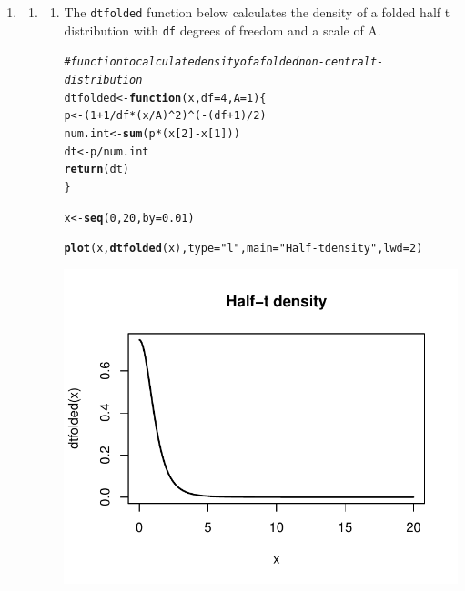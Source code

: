 \documentclass[12pt]{article}\usepackage[]{graphicx}\usepackage[]{color}
\makeatletter
\newcommand{\hlnum}[1]{\textcolor[rgb]{0.686,0.059,0.569}{#1}}%
\newcommand{\hlstr}[1]{\textcolor[rgb]{0.192,0.494,0.8}{#1}}%
\newcommand{\hlcom}[1]{\textcolor[rgb]{0.678,0.584,0.686}{\textit{#1}}}%
\newcommand{\hlopt}[1]{\textcolor[rgb]{0,0,0}{#1}}%
\newcommand{\hlstd}[1]{\textcolor[rgb]{0.345,0.345,0.345}{#1}}%
\newcommand{\hlkwa}[1]{\textcolor[rgb]{0.161,0.373,0.58}{\textbf{#1}}}%
\newcommand{\hlkwb}[1]{\textcolor[rgb]{0.69,0.353,0.396}{#1}}%
\newcommand{\hlkwc}[1]{\textcolor[rgb]{0.333,0.667,0.333}{#1}}%
\newcommand{\hlkwd}[1]{\textcolor[rgb]{0.737,0.353,0.396}{\textbf{#1}}}%
\newenvironment{kframe}{%
 \def\at@end@of@kframe{}%
 \ifinner\ifhmode%
  \def\at@end@of@kframe{\end{minipage}}%
  \begin{minipage}{\columnwidth}%
 \fi\fi%
 \def\FrameCommand##1{\hskip\@totalleftmargin \hskip-\fboxsep
 \colorbox{shadecolor}{##1}\hskip-\fboxsep
     \hskip-\linewidth \hskip-\@totalleftmargin \hskip\columnwidth}%
 \MakeFramed {\advance\hsize-\width
   \@totalleftmargin\z@ \linewidth\hsize
   \@setminipage}}%
 {\par\unskip\endMakeFramed%
 \at@end@of@kframe}
\newenvironment{knitrout}{}{} %
\makeatother
\begin{document}
\begin{doublespacing}
\begin{enumerate}
\begin{enumerate}
\end{enumerate}

\item \begin{enumerate}

\item \begin{enumerate}
\item The \verb+dtfolded+ function below calculates the density of a folded half t distribution with \verb+df+ degrees of freedom and a scale of A.
\begin{center}
\begin{singlespace}
\begin{knitrout}\footnotesize
{}\color{fgcolor}\begin{kframe}
\begin{alltt}
\hlcom{# function to calculate density of a folded non-central t-distribution}
\hlstd{dtfolded} \hlkwb{<-} \hlkwa{function} \hlstd{(}\hlkwc{x}\hlstd{,} \hlkwc{df}\hlstd{=}\hlnum{4}\hlstd{,} \hlkwc{A}\hlstd{=}\hlnum{1}\hlstd{) \{}
  \hlstd{p} \hlkwb{<-} \hlstd{(}\hlnum{1}\hlopt{+}\hlnum{1}\hlopt{/}\hlstd{df}\hlopt{*}\hlstd{(x}\hlopt{/}\hlstd{A)}\hlopt{^}\hlnum{2}\hlstd{)}\hlopt{^}\hlstd{(}\hlopt{-}\hlstd{(df}\hlopt{+}\hlnum{1}\hlstd{)}\hlopt{/}\hlnum{2}\hlstd{)}
  \hlstd{num.int} \hlkwb{<-} \hlkwd{sum}\hlstd{(p}\hlopt{*}\hlstd{(x[}\hlnum{2}\hlstd{]}\hlopt{-}\hlstd{x[}\hlnum{1}\hlstd{]))}
  \hlstd{dt} \hlkwb{<-} \hlstd{p}\hlopt{/}\hlstd{num.int}
  \hlkwd{return}\hlstd{(dt)}
\hlstd{\}}

\hlstd{x} \hlkwb{<-} \hlkwd{seq}\hlstd{(}\hlnum{0}\hlstd{,} \hlnum{20}\hlstd{,} \hlkwc{by}\hlstd{=}\hlnum{0.01}\hlstd{)}

\hlkwd{plot}\hlstd{(x,} \hlkwd{dtfolded}\hlstd{(x),} \hlkwc{type}\hlstd{=}\hlstr{"l"}\hlstd{,} \hlkwc{main}\hlstd{=}\hlstr{"Half-t density"}\hlstd{,} \hlkwc{lwd}\hlstd{=}\hlnum{2}\hlstd{)}
\end{alltt}
\end{kframe}
\includegraphics[width=.5\linewidth]{figure/density} 


\end{knitrout}
\end{singlespace}
\end{center}
\end{enumerate}
\end{enumerate}
\end{enumerate}
\end{doublespacing}
\end{document}
